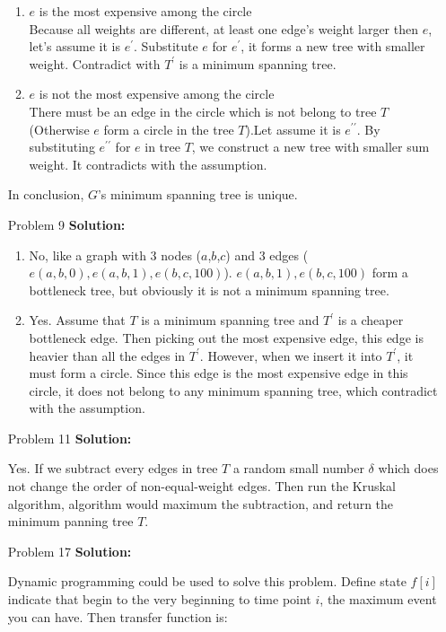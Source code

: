 \normalfont\documentclass[letterpaper,11pt]{article}
\begin{document}
\begin{enumerate}
\begin{enumerate}
	\item$e$ is the most expensive among the circle\\
		Because all weights are different, at least one edge's weight larger then $e$, let's assume it is $e^\prime$. Substitute $e$ for $e^\prime$, it forms a new tree with smaller weight. Contradict with $T^\prime$ is a minimum spanning tree.
	\item$e$ is not the most expensive among the circle\\
		There must be an edge in the circle which is not belong to tree $T$(Otherwise $e$ form a circle in the tree $T$).Let assume it is $e^{\prime\prime}$. By substituting $e^{\prime\prime}$ for $e$ in tree $T$, we construct a new tree with smaller sum weight. It contradicts with the assumption.
\end{enumerate}
In conclusion, $G$'s minimum spanning tree is unique.
\item [Problem 9]\textbf{Solution:}\par
\begin{enumerate}
	\item No, like a graph with 3 nodes ($a$,$b$,$c$) and 3 edges ($e(a,b,0),e(a,b,1),e(b,c,100)$). $e(a,b,1),e(b,c,100)$ form a bottleneck tree, but obviously it is not a minimum spanning tree.
	\item Yes. Assume that $T$ is a minimum spanning tree and $T^\prime$ is a cheaper bottleneck edge. Then picking out the most expensive edge, this edge is heavier than all the edges in $T^\prime$. However, when we insert it into $T^\prime$, it must form a circle. Since this edge is the most expensive edge in this circle, it does not belong to any minimum spanning tree, which contradict with the assumption.
\end{enumerate}
\item [Problem 11]\textbf{Solution:}\par
	Yes. If we subtract every edges in tree $T$ a random small number $\delta$ which does not change the order of non-equal-weight edges. Then run the Kruskal algorithm, algorithm would maximum the subtraction, and return the minimum panning tree $T$.
\item [Problem 17]\textbf{Solution:}\par
	Dynamic programming could be used to solve this problem. Define state $f[i]$ indicate that begin to the very beginning to time point $i$, the maximum event you can have. Then transfer function is:
	\begin{enumerate}

\end{enumerate}
\end{enumerate}
\end{document}
